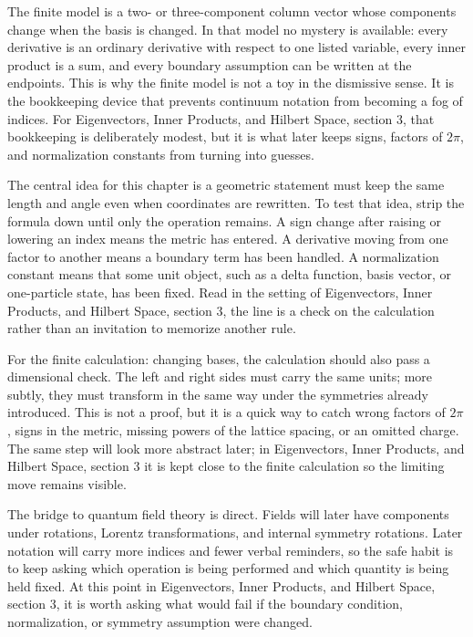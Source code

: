 The finite model is a two- or three-component column vector whose components change when the basis is changed.  In that model no mystery is available: every derivative is an ordinary derivative with respect to one listed variable, every inner product is a sum, and every boundary assumption can be written at the endpoints.  This is why the finite model is not a toy in the dismissive sense.  It is the bookkeeping device that prevents continuum notation from becoming a fog of indices.  For Eigenvectors, Inner Products, and Hilbert Space, section 3, that bookkeeping is deliberately modest, but it is what later keeps signs, factors of \(2\pi\), and normalization constants from turning into guesses.

The central idea for this chapter is a geometric statement must keep the same length and angle even when coordinates are rewritten.  To test that idea, strip the formula down until only the operation remains.  A sign change after raising or lowering an index means the metric has entered.  A derivative moving from one factor to another means a boundary term has been handled.  A normalization constant means that some unit object, such as a delta function, basis vector, or one-particle state, has been fixed.  Read in the setting of Eigenvectors, Inner Products, and Hilbert Space, section 3, the line is a check on the calculation rather than an invitation to memorize another rule.

For the finite calculation: changing bases, the calculation should also pass a dimensional check.  The left and right sides must carry the same units; more subtly, they must transform in the same way under the symmetries already introduced.  This is not a proof, but it is a quick way to catch wrong factors of \(2\pi\), signs in the metric, missing powers of the lattice spacing, or an omitted charge.  The same step will look more abstract later; in Eigenvectors, Inner Products, and Hilbert Space, section 3 it is kept close to the finite calculation so the limiting move remains visible.

The bridge to quantum field theory is direct.  Fields will later have components under rotations, Lorentz transformations, and internal symmetry rotations.  Later notation will carry more indices and fewer verbal reminders, so the safe habit is to keep asking which operation is being performed and which quantity is being held fixed.  At this point in Eigenvectors, Inner Products, and Hilbert Space, section 3, it is worth asking what would fail if the boundary condition, normalization, or symmetry assumption were changed.

